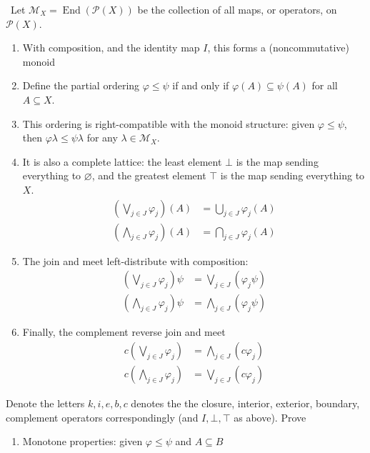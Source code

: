 \documentclass{treatise}
\begin{document}
\begin{proposition} \label{topo-subset-alg-prop-1} \
Let $\mathcal{M}_X = \operatorname{End}(\mathcal{P}(X))$ be the collection of all maps, or operators, on $\mathcal{P}(X)$.
\begin{enumerate}
    \item With composition, and the identity map $I$, this forms a (noncommutative) monoid
    \item Define the partial ordering $\varphi \leq \psi$ if and only if $\varphi(A) \subseteq \psi(A)$ for all $A \subseteq X$.
    \item This ordering is right-compatible with the monoid structure: given $\varphi \leq \psi$, then $\varphi \lambda \leq \psi \lambda$ for any $\lambda \in \mathcal{M}_X$.
    \item It is also a complete lattice: the least element $\bot$ is the map sending everything to $\varnothing$, and the greatest element $\top$ is the map sending everything to $X$.
    \begin{align*}
        \left( \bigvee_{j \in J} \varphi_j \right)(A) & = \bigcup_{j \in J} \varphi_j(A)
        \\
        \left( \bigwedge_{j \in J} \varphi_j \right)(A) & = \bigcap_{j \in J} \varphi_j(A)
    \end{align*}
    \item The join and meet left-distribute with composition:
    \begin{align*}
        \left( \bigvee_{j \in J} \varphi_j \right) \psi & = \bigvee_{j \in J} (\varphi_j \psi)
        \\
        \left( \bigwedge_{j \in J} \varphi_j \right) \psi & = \bigwedge_{j \in J} (\varphi_j \psi)
    \end{align*}
    \item Finally, the complement reverse join and meet
    \begin{align*}
        c \left( \bigvee_{j \in J} \varphi_j \right) & = \bigwedge_{j \in J} (c \varphi_j)
        \\
        c \left( \bigwedge_{j \in J} \varphi_j \right) & = \bigvee_{j \in J} (c \varphi_j)
    \end{align*}
\end{enumerate}
Denote the letters $k, i, e, b, c$ denotes the the closure, interior, exterior, boundary, complement operators correspondingly (and $I, \bot, \top$ as above). Prove
\begin{enumerate}
    \item Monotone properties: given $\varphi \leq \psi$ and $A \subseteq B$

\end{enumerate}
\end{proposition}
\end{document}
